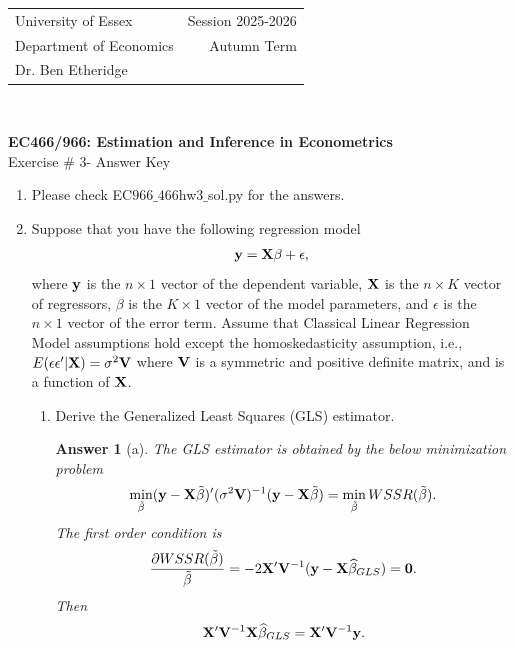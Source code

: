 \documentclass[12pt,a4paper]{article}
\newtheorem{ans}{Answer}
\begin{document}
\begin{tabular}{l r}
University of Essex  \hspace{35ex}& Session 2025-2026 \\
Department of Economics \hspace{35ex} & Autumn Term\\
Dr. Ben Etheridge \hspace{35ex} &
\end{tabular}
\\
\begin{center}
\large{\textbf{EC466/966: Estimation and Inference in Econometrics}\\
Exercise \# 3- Answer Key}
\end{center}

\begin{enumerate}
\item{Please check EC$966\_466$hw$3\_$sol.py for the answers.}
\item{Suppose that you have the following regression model}
\begin{align*}
{\bf y}={\bf X}\beta +\epsilon,
\end{align*}
where ${\bf y}$ is the $n \times 1$ vector of the dependent variable, ${\bf X}$ is the $n \times K$ vector of regressors, $\beta$ is the $K \times 1$ vector of the model parameters, and $\epsilon$ is the $n \times 1$ vector of the error term. Assume that Classical Linear Regression Model assumptions hold except the homoskedasticity assumption, i.e., $E(\epsilon \epsilon'|{\bf X})=\sigma^{2}{\bf V}$ where ${\bf V}$ is a symmetric and positive definite matrix, and is a function of ${\bf X}$. 
\begin{enumerate}
\item{Derive the Generalized Least Squares (GLS) estimator.}
\setcounter{ans}{1}
\begin{ans}[a]
The GLS estimator is obtained by the below minimization problem
\begin{align*}
\min_{\tilde{\beta}}({\bf y}-{\bf X}\tilde{\beta})'(\sigma^{2}{\bf V})^{-1}({\bf y}-{\bf X}\tilde{\beta})=\min_{\tilde{\beta}}WSSR(\tilde{\beta}).
\end{align*}
The first order condition is
\begin{align*}
\frac{\partial WSSR(\tilde{\beta})}{\tilde{\beta}}=-2{\bf X}'{\bf V}^{-1}({\bf y}-{\bf X}\widehat{\beta}_{GLS})=\bf{0}.
\end{align*}
Then 
\begin{align*}
{\bf X}'{\bf V}^{-1}{\bf X}\widehat{\beta}_{GLS}={\bf X}'{\bf V}^{-1}{\bf y}.

\end{align*}
\end{ans}
\end{enumerate}
\end{enumerate}
\end{document}
